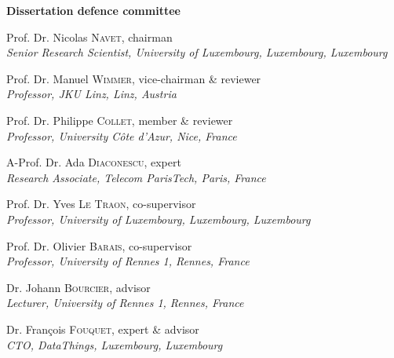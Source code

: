 \vspace{0.4cm}

\begin{adjustwidth*}{1em}{1em}

\noindent
\textbf{\large Dissertation defence committee}

\vspace{0.2cm}
\noindent
Prof. Dr. Nicolas \textsc{Navet}, chairman\\
{\small \emph{Senior Research Scientist, University of Luxembourg, Luxembourg, Luxembourg}}

\vspace{0.2cm}
\noindent
Prof. Dr. Manuel \textsc{Wimmer}, vice-chairman \& reviewer\\
{\small \emph{Professor, JKU Linz, Linz, Austria}}

\vspace{0.2cm}
\noindent
Prof. Dr. Philippe \textsc{Collet}, member \& reviewer\\
{\small \emph{Professor, University Côte d'Azur, Nice, France}}

\vspace{0.2cm}
\noindent
A-Prof. Dr. Ada \textsc{Diaconescu}, expert\\
{\small \emph{Research Associate, Telecom ParisTech, Paris, France}}   

\vspace{0.2cm}
\noindent
Prof. Dr. Yves \textsc{Le Traon}, co-supervisor\\
{\small \emph{Professor, University of Luxembourg, Luxembourg, Luxembourg}}

\vspace{0.2cm}
\noindent
Prof. Dr. Olivier \textsc{Barais}, co-supervisor\\
{\small \emph{Professor, University of Rennes 1, Rennes, France}}

\vspace{0.2cm}
\noindent
Dr. Johann \textsc{Bourcier}, advisor\\
{\small \emph{Lecturer, University of Rennes 1, Rennes, France}}   

\vspace{0.2cm}
\noindent
Dr.  Fran\c{c}ois \textsc{Fouquet}, expert \& advisor\\
{\small \emph{CTO, DataThings, Luxembourg, Luxembourg}}   

\end{adjustwidth*}
